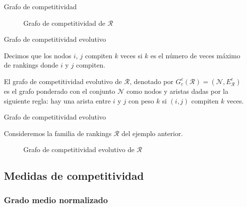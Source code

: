 \documentclass[11pt]{beamer}
\begin{document}
	\begin{frame}{Grafo de competitividad}
		\begin{ejemplo}[continuación]
			\begin{figure}
				\centering
				\ejemplografocompetitividad
				\caption{Grafo de competitividad de $\mathcal{R}$}
				\label{fig:grafo_competitividad}
			\end{figure}	
		\end{ejemplo}
	\end{frame}
	
	\begin{frame}{Grafo de competitividad evolutivo}
		\begin{defi}
			Decimos que los nodos $i$, $j$ compiten $k$ veces si $k$ es el número de veces máximo de rankings donde $i$ y $j$ compiten.
		\end{defi}
		
		\begin{defi}
			El grafo de competitividad evolutivo de $\mathcal{R}$, denotado por $G_c^e(\mathcal{R}) = (\mathcal{N}, E_\mathcal{R}^e)$ es el grafo ponderado con el conjunto $\mathcal{N}$ como nodos y aristas dadas por la siguiente regla: hay una arista entre $i$ y $j$ con peso $k$ si $(i,j)$ compiten $k$ veces.
		\end{defi}
	\end{frame}
	
	\begin{frame}{Grafo de competitividad evolutivo}
		\begin{ejemplo}
			Consideremos la familia de rankings $\mathcal{R}$ del ejemplo anterior.
			
			\begin{figure}
				\centering
				\resizebox{!}{0.5\textheight}{\ejemplografocompetitividadevolutivo}
				
				\caption{Grafo de competitividad evolutivo de $\mathcal{R}$}
				\label{fig:grafo_competitividad_evolutivo}
			\end{figure}
			
		\end{ejemplo}
	\end{frame}
	
	\subsection{Medidas de competitividad}
	
	\subsubsection{Grado medio normalizado}
	
\end{document}
